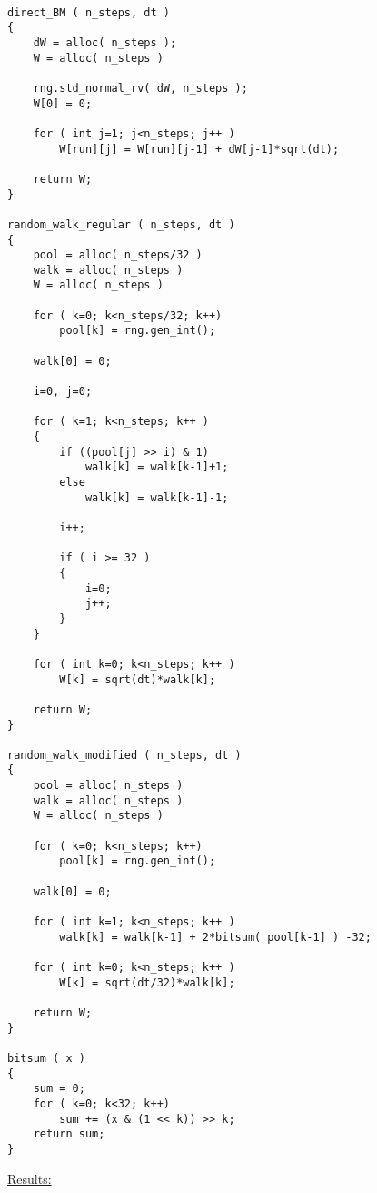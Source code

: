 \documentclass[12pt]{article}
\begin{document}
\lstset{language=c++ }
\begin{lstlisting}

direct_BM ( n_steps, dt )
{
    dW = alloc( n_steps );
    W = alloc( n_steps )
    
    rng.std_normal_rv( dW, n_steps );
    W[0] = 0;
    
    for ( int j=1; j<n_steps; j++ )
        W[run][j] = W[run][j-1] + dW[j-1]*sqrt(dt);
    
    return W;
}

random_walk_regular ( n_steps, dt )
{
    pool = alloc( n_steps/32 )
    walk = alloc( n_steps )
    W = alloc( n_steps )
    
    for ( k=0; k<n_steps/32; k++)
        pool[k] = rng.gen_int();
    
    walk[0] = 0;
    
    i=0, j=0;
    
    for ( k=1; k<n_steps; k++ )
    {
        if ((pool[j] >> i) & 1)
            walk[k] = walk[k-1]+1;
        else
            walk[k] = walk[k-1]-1;
        
        i++;
        
        if ( i >= 32 )
        {
            i=0;
            j++;
        }
    }
    
    for ( int k=0; k<n_steps; k++ )
        W[k] = sqrt(dt)*walk[k];
    
    return W;
}

random_walk_modified ( n_steps, dt )
{
    pool = alloc( n_steps )
    walk = alloc( n_steps )
    W = alloc( n_steps )
    
    for ( k=0; k<n_steps; k++)
        pool[k] = rng.gen_int();
    
    walk[0] = 0;
    
    for ( int k=1; k<n_steps; k++ )
        walk[k] = walk[k-1] + 2*bitsum( pool[k-1] ) -32;
    
    for ( int k=0; k<n_steps; k++ )
        W[k] = sqrt(dt/32)*walk[k];
    
    return W;
}

bitsum ( x )
{
    sum = 0;
    for ( k=0; k<32; k++)
        sum += (x & (1 << k)) >> k;
    return sum;
}

\end{lstlisting}


\begin{flushleft}
\underline{Results:}
\end{flushleft}
\end{document}
